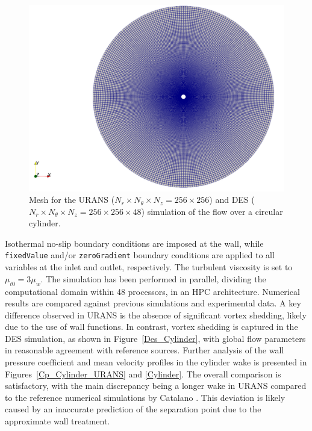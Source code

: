 \documentclass[a5paper]{sapthesis}
\begin{document}
	\begin{figure}[h]
		\centering
		\includegraphics[width=0.8 \linewidth]{Figures/Cylinder_mesh}
		\caption[Mesh for the URANS and DES simulation of the cylinder]{Mesh for the URANS ($ N_r \times N_\theta \times N_z = 256 \times 256$) and DES ($ N_r \times N_\theta \times N_z = 256 \times 256 \times 48 $) simulation of the flow over a circular cylinder.}
		\label{Cylinder_mesh}
	\end{figure} 
	
	\noindent Isothermal no-slip boundary conditions are imposed at the wall, while \texttt{fixedValue} and/or \texttt{zeroGradient} boundary conditions are applied to all variables at the inlet and outlet, respectively. The turbulent viscosity is set to $\mu_{t0} = 3\mu_w$. The simulation has been performed in parallel, dividing the computational domain within 48 processors, in an HPC architecture. Numerical results are compared against previous simulations and experimental data. A key difference observed in URANS is the absence of significant vortex shedding, likely due to the use of wall functions. In contrast, vortex shedding is captured in the DES simulation, as shown in Figure~\ref{Des_Cylinder}, with global flow parameters in reasonable agreement with reference sources. Further analysis of the wall pressure coefficient and mean velocity profiles in the cylinder wake is presented in Figures~\ref{Cp_Cylinder_URANS} and \ref{Cylinder}. The overall comparison is satisfactory, with the main discrepancy being a longer wake in URANS compared to the reference numerical simulations by Catalano \cite{Catalano}. This deviation is likely caused by an inaccurate prediction of the separation point due to the approximate wall treatment.
	
\end{document}
